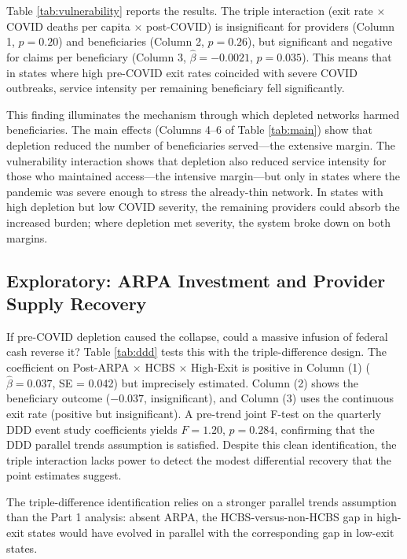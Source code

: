 \documentclass[12pt]{article}
\begin{document}


Table \ref{tab:vulnerability} reports the results. The triple interaction (exit rate $\times$ COVID deaths per capita $\times$ post-COVID) is insignificant for providers (Column 1, $p = 0.20$) and beneficiaries (Column 2, $p = 0.26$), but significant and negative for claims per beneficiary (Column 3, $\hat{\beta} = -0.0021$, $p = 0.035$). This means that in states where high pre-COVID exit rates coincided with severe COVID outbreaks, service intensity per remaining beneficiary fell significantly.

This finding illuminates the mechanism through which depleted networks harmed beneficiaries. The main effects (Columns 4--6 of Table \ref{tab:main}) show that depletion reduced the number of beneficiaries served---the extensive margin. The vulnerability interaction shows that depletion also reduced service intensity for those who maintained access---the intensive margin---but only in states where the pandemic was severe enough to stress the already-thin network. In states with high depletion but low COVID severity, the remaining providers could absorb the increased burden; where depletion met severity, the system broke down on both margins.

\subsection{Exploratory: ARPA Investment and Provider Supply Recovery}

If pre-COVID depletion caused the collapse, could a massive infusion of federal cash reverse it? Table \ref{tab:ddd} tests this with the triple-difference design. The coefficient on Post-ARPA $\times$ HCBS $\times$ High-Exit is positive in Column (1) ($\hat{\beta} = 0.037$, SE = 0.042) but imprecisely estimated. Column (2) shows the beneficiary outcome ($-0.037$, insignificant), and Column (3) uses the continuous exit rate (positive but insignificant). A pre-trend joint F-test on the quarterly DDD event study coefficients yields $F = 1.20$, $p = 0.284$, confirming that the DDD parallel trends assumption is satisfied. Despite this clean identification, the triple interaction lacks power to detect the modest differential recovery that the point estimates suggest.



The triple-difference identification relies on a stronger parallel trends assumption than the Part 1 analysis: absent ARPA, the HCBS-versus-non-HCBS gap in high-exit states would have evolved in parallel with the corresponding gap in low-exit states.
\end{document}
